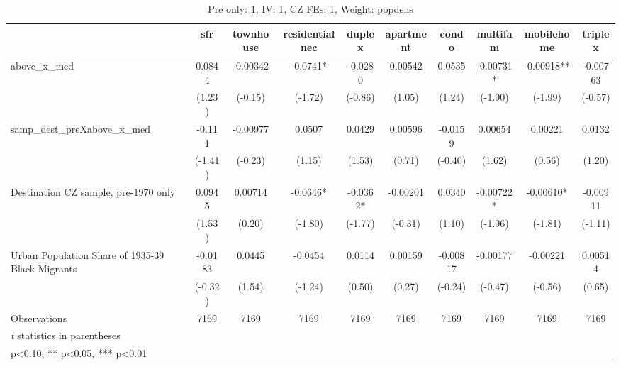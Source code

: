 \begin{table}[htbp]\centering
\def\sym#1{\ifmmode^{#1}\else\(^{#1}\)\fi}
\caption{Pre only: 1, IV: 1, CZ FEs: 1, Weight: popdens}
\begin{tabular}{l*{9}{c}}
\toprule
                    &\multicolumn{1}{c}{sfr}&\multicolumn{1}{c}{townhouse}&\multicolumn{1}{c}{residentialnec}&\multicolumn{1}{c}{duplex}&\multicolumn{1}{c}{apartment}&\multicolumn{1}{c}{condo}&\multicolumn{1}{c}{multifam}&\multicolumn{1}{c}{mobilehome}&\multicolumn{1}{c}{triplex}\\
\midrule
above\_x\_med         &      0.0844   &    -0.00342   &     -0.0741*  &     -0.0280   &     0.00542   &      0.0535   &    -0.00731*  &    -0.00918** &    -0.00763   \\
                    &      (1.23)   &     (-0.15)   &     (-1.72)   &     (-0.86)   &      (1.05)   &      (1.24)   &     (-1.90)   &     (-1.99)   &     (-0.57)   \\
\addlinespace
samp\_dest\_preXabove\_x\_med&      -0.111   &    -0.00977   &      0.0507   &      0.0429   &     0.00596   &     -0.0159   &     0.00654   &     0.00221   &      0.0132   \\
                    &     (-1.41)   &     (-0.23)   &      (1.15)   &      (1.53)   &      (0.71)   &     (-0.40)   &      (1.62)   &      (0.56)   &      (1.20)   \\
\addlinespace
Destination CZ sample, pre-1970 only&      0.0945   &     0.00714   &     -0.0646*  &     -0.0362*  &    -0.00201   &      0.0340   &    -0.00722*  &    -0.00610*  &    -0.00911   \\
                    &      (1.53)   &      (0.20)   &     (-1.80)   &     (-1.77)   &     (-0.31)   &      (1.10)   &     (-1.96)   &     (-1.81)   &     (-1.11)   \\
\addlinespace
Urban Population Share of 1935-39 Black Migrants&     -0.0183   &      0.0445   &     -0.0454   &      0.0114   &     0.00159   &    -0.00817   &    -0.00177   &    -0.00221   &     0.00514   \\
                    &     (-0.32)   &      (1.54)   &     (-1.24)   &      (0.50)   &      (0.27)   &     (-0.24)   &     (-0.47)   &     (-0.56)   &      (0.65)   \\
\midrule
Observations        &        7169   &        7169   &        7169   &        7169   &        7169   &        7169   &        7169   &        7169   &        7169   \\
\bottomrule
\multicolumn{10}{l}{\footnotesize \textit{t} statistics in parentheses}\\
\multicolumn{10}{l}{\footnotesize * p<0.10, ** p<0.05, *** p<0.01}\\
\end{tabular}
\end{table}
